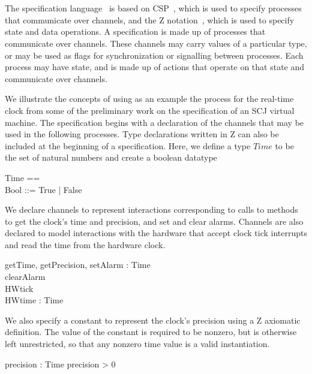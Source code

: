 \documentclass[a4paper,10pt]{report}
\begin{document}
\section{\Circus{}}
\label{circus-section}

The \Circus{} specification language~\cite{oliveira2009} is based on
CSP~\cite{roscoe2011}, which is used to specify processes that communicate over
channels, and the Z notation~\cite{woodcock1996}, which is used to specify state
and data operations.  A \Circus{} specification is made up of processes that
communicate over channels.  These channels may carry values of a particular
type, or may be used as flags for synchronization or signalling between
processes.  Each process may have state, and is made up of actions that operate
on that state and communicate over channels.

We illustrate the concepts of \Circus{} using as an example the process for
the real-time clock from some of the preliminary work on the specification of an
SCJ virtual machine. The specification begins with a declaration of the channels
that may be used in the following processes.  Type declarations written in Z can
also be included at the beginning of a \Circus{} specification. Here, we define
a type $Time$ to be the set of natural numbers and create a boolean datatype
%
\begin{zed}
  Time == \nat \\
  Bool ::= True | False \\
\end{zed}
%
We declare channels to represent interactions corresponding to calls to methods
to get the clock's time and precision, and set and clear alarms. Channels are
also declared to model interactions with the hardware that accept clock tick
interrupts and read the time from the hardware clock.
%
\begin{circus}
  \circchannel getTime, getPrecision, setAlarm : Time \\
  \circchannel clearAlarm \\
  \circchannel HWtick \\
  \circchannel HWtime : Time \\
\end{circus}
%
We also specify a constant to represent the clock's precision using a Z
axiomatic definition. The value of the constant is required to be nonzero, but is
otherwise left unrestricted, so that any nonzero time value is a valid
instantiation.
%
\begin{axdef}
  precision : Time
\where
  precision > 0
\end{axdef}
\end{document}
